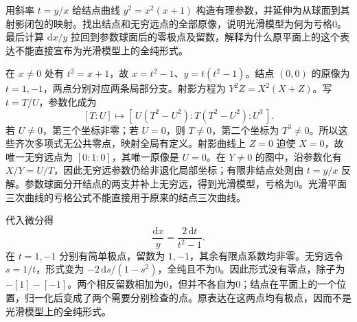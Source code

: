 \begin{exercise}\label{b3:ex:A-8}
用斜率 \(t=y/x\) 给结点曲线 \(y^2=x^2(x+1)\) 构造有理参数，并延伸为从球面到其射影闭包的映射。找出结点和无穷远点的全部原像，说明光滑模型为何为亏格0。最后计算 \(\mathrm{d}x/y\) 拉回到参数球面后的零极点及留数，解释为什么原平面上的这个表达不能直接宣布为光滑模型上的全纯形式。
\end{exercise}
\begin{solution}
在 \(x\ne0\) 处有 \(t^2=x+1\)，故 \(x=t^2-1\)、\(y=t(t^2-1)\)。结点 \((0,0)\) 的原像为 \(t=1,-1\)，两点分别对应两条局部分支。射影方程为 \(Y^2Z=X^2(X+Z)\)。写 \(t=T/U\)，参数化成为
\[
 [T:U]\longmapsto
 [\,U(T^2-U^2):T(T^2-U^2):U^3\,].
\]
若 \(U\ne0\)，第三个坐标非零；若 \(U=0\)，则 \(T\ne0\)，第二个坐标为 \(T^3\ne0\)。所以这些齐次多项式无公共零点，映射全局有定义。射影曲线上 \(Z=0\) 迫使 \(X=0\)，故唯一无穷远点为 \([0:1:0]\)，其唯一原像是 \(U=0\)。在 \(Y\ne0\) 的图中，沿参数化有 \(X/Y=U/T\)，因此无穷远参数仍给非退化局部坐标；有限非结点处则由 \(t=y/x\) 反解。参数球面分开结点的两支并补上无穷远，得到光滑模型，亏格为0。光滑平面三次曲线的亏格公式不能直接用于原来的结点三次曲线。

代入微分得
\[
 \frac{\mathrm{d}x}{y}=\frac{2\,\mathrm{d}t}{t^2-1}.
\]
在 \(t=1,-1\) 分别有简单极点，留数为 \(1,-1\)，其余有限点系数均非零。无穷远令 \(s=1/t\)，形式变为 \(-2\,\mathrm{d}s/(1-s^2)\)，全纯且不为0。因此形式没有零点，除子为 \(-[1]-[-1]\)。两个相反留数相加为0，但并不各自为0；结点在平面上的一个位置，归一化后变成了两个需要分别检查的点。原表达在这两点均有极点，因而不是光滑模型上的全纯形式。
\end{solution}

